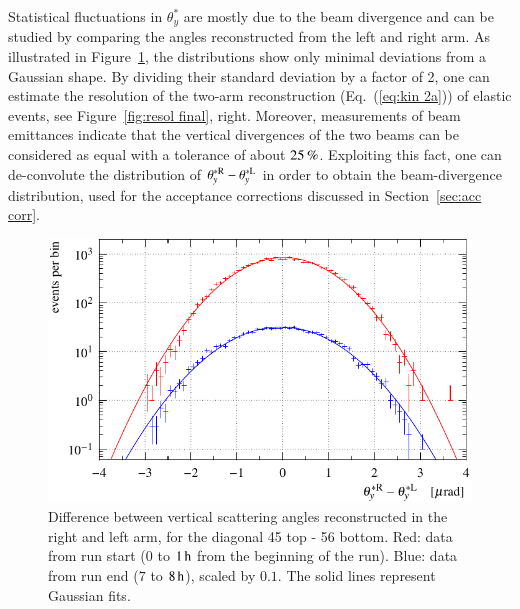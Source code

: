 Statistical fluctuations in $\theta_y^*$ are mostly due to the beam divergence and can be studied by comparing the angles reconstructed from the left and right arm. As illustrated in Figure~\ref{fig:beam div vert}, the distributions show only minimal deviations from a Gaussian shape.
%
By dividing their standard deviation by a factor of 2, one can estimate the resolution of the two-arm reconstruction (Eq.~(\ref{eq:kin 2a})) of elastic events, see Figure~\ref{fig:resol final}, right.
%
Moreover, measurements of beam emittances \cite{op-elog} indicate that the vertical divergences of the two beams can be considered as equal with a tolerance of about $25\,{\rm \%}$. Exploiting this fact, one can de-convolute the distribution of $\theta_y^{*\rm R} - \theta_y^{*\rm L}$ in order to obtain the beam-divergence distribution, used for the acceptance corrections discussed in Section~\ref{sec:acc corr}.

\begin{figure}
\begin{center}
\includegraphics{fig/beam_divergence_fits.pdf}
\caption{%
Difference between vertical scattering angles reconstructed in the right and left arm, for the diagonal 45 top - 56 bottom. Red: data from run start ($0$ to $1\,{\rm h}$ from the beginning of the run). Blue: data from run end ($7$ to $8\,{\rm h}$), scaled by $0.1$. The solid lines represent Gaussian fits.
}
\label{fig:beam div vert}
\end{center}
\end{figure}

